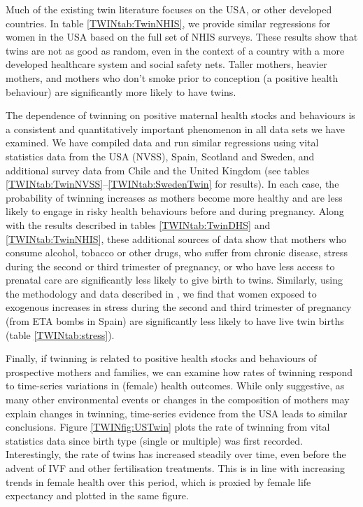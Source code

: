 \documentclass[subeqn]{article}
\begin{document}
\begin{spacing}{1.4}
Much of the existing twin literature focuses on the USA, or other developed
countries. In table \ref{TWINtab:TwinNHIS}, we provide similar regressions for 
women in the USA based on the full set of NHIS surveys.  These results show
that twins are not as good as random, even in the context of a country with 
a more developed healthcare system and social safety nets. Taller mothers,
heavier mothers, and mothers who don't smoke prior to conception (a positive
health behaviour) are significantly more likely to have twins.

The dependence of twinning on positive maternal health stocks and behaviours is
a consistent and quantitatively important phenomenon in all data sets we have
examined.  We have compiled data and run similar regressions using vital 
statistics data from the USA (NVSS), Spain, Scotland and Sweden, and 
additional survey data from Chile and the United Kingdom (see tables 
\ref{TWINtab:TwinNVSS}--\ref{TWINtab:SwedenTwin} for results).  In each case,
the probability of twinning increases as mothers become more healthy and are
less likely to engage in risky health behaviours before and during pregnancy.
Along with the results described in tables \ref{TWINtab:TwinDHS} and 
\ref{TWINtab:TwinNHIS}, these additional sources of data show that mothers
who consume alcohol, tobacco or other drugs, who suffer from chronic disease,
stress during the second or third trimester of pregnancy, or who have less 
access to prenatal care are significantly less likely to give birth to twins.
Similarly, using the methodology and data described in 
\citet{QuintanaRodenas2014}, we find that women exposed to exogenous increases
in stress during the second and third trimester of pregnancy (from ETA bombs in 
Spain) are significantly less likely to have live twin births (table 
\ref{TWINtab:stress}).

Finally, if twinning is related to positive health stocks and behaviours of
prospective mothers and families, we can examine how rates of twinning respond
to time-series variations in (female) health outcomes.  While only suggestive,
as many other environmental events or changes in the composition of mothers may 
explain changes in twinning, time-series evidence from the USA leads to similar 
conclusions.  Figure
\ref{TWINfig:USTwin} plots the rate of twinning from vital statistics data since
birth type (single or multiple) was first recorded.  Interestingly, the rate of
twins has increased steadily over time, even before the advent of IVF and other
fertilisation treatments.  This is in line with increasing trends in female
health over this period, which is proxied by female life expectancy and plotted
in the same figure.



\end{spacing}
\end{document}
